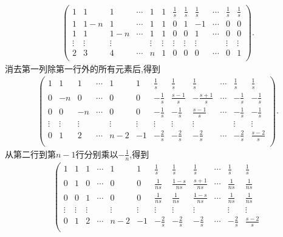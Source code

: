 \documentclass[../../main.tex]{subfiles}
\begin{document}
\begin{solution}
\begin{gather*}
\left( \begin{matrix}
1&		1&		1&		\cdots&		1&		1&		\frac{1}{s}&		\frac{1}{s}&		\frac{1}{s}&		\cdots&		\frac{1}{s}&		\frac{1}{s}\\
1&		1-n&		1&		\cdots&		1&		1&		0&		1&		-1&		\cdots&		0&		0\\
1&		1&		1-n&		\cdots&		1&		1&		0&		0&		1&		\cdots&		0&		0\\
\vdots&		\vdots&		\vdots&		&		\vdots&		\vdots&		\vdots&		\vdots&		\vdots&		&		\vdots&		\vdots\\
2&		3&		4&		\cdots&		n&		1&		0&		0&		0&		\cdots&		0&		1\\
\end{matrix} \right) .
\end{gather*}
消去第一列除第一行外的所有元素后,得到
\begin{gather*}
\left( \begin{matrix}
1&		1&		1&		\cdots&		1&		1&		\frac{1}{s}&		\frac{1}{s}&		\frac{1}{s}&		\cdots&		\frac{1}{s}&		\frac{1}{s}\\
0&		-n&		0&		\cdots&		0&		0&		-\frac{1}{s}&		\frac{s-1}{s}&		-\frac{s+1}{s}&		\cdots&		-\frac{1}{s}&		-\frac{1}{s}\\
0&		0&		-n&		\cdots&		0&		0&		-\frac{1}{s}&		-\frac{1}{s}&		\frac{s-1}{s}&		\cdots&		-\frac{1}{s}&		-\frac{1}{s}\\
\vdots&		\vdots&		\vdots&		&		\vdots&		\vdots&		\vdots&		\vdots&		\vdots&		&		\vdots&		\vdots\\
0&		1&		2&		\cdots&		n-2&		-1&		-\frac{2}{s}&		-\frac{2}{s}&		-\frac{2}{s}&		\cdots&		-\frac{2}{s}&		\frac{s-2}{s}\\
\end{matrix} \right) .
\end{gather*}
从第二行到第\(n - 1\)行分别乘以\(-\frac{1}{n}\),得到
\begin{gather*}
\left( \begin{matrix}
1&		1&		1&		\cdots&		1&		1&		\frac{1}{s}&		\frac{1}{s}&		\frac{1}{s}&		\cdots&		\frac{1}{s}&		\frac{1}{s}\\
0&		1&		0&		\cdots&		0&		0&		\frac{1}{ns}&		\frac{1-s}{ns}&		\frac{s+1}{ns}&		\cdots&		\frac{1}{ns}&		\frac{1}{ns}\\
0&		0&		1&		\cdots&		0&		0&		\frac{1}{ns}&		\frac{1}{ns}&		\frac{1-s}{ns}&		\cdots&		\frac{1}{ns}&		\frac{1}{ns}\\
\vdots&		\vdots&		\vdots&		&		\vdots&		\vdots&		\vdots&		\vdots&		\vdots&		&		\vdots&		\vdots\\
0&		1&		2&		\cdots&		n-2&		-1&		-\frac{2}{s}&		-\frac{2}{s}&		-\frac{2}{s}&		\cdots&		-\frac{2}{s}&		\frac{s-2}{s}\\

\end{matrix}
\end{gather*}
\end{solution}
\end{document}
